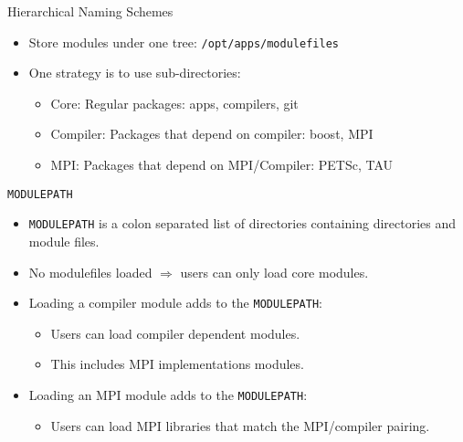 \documentclass[dvipsnames,aspectratio=169]{beamer}
\begin{document}
\begin{frame}{Hierarchical Naming Schemes}
  \begin{itemize}
    \item Store modules under one tree: \texttt{/opt/apps/modulefiles}
    \item One strategy is to use sub-directories:
      \begin{itemize}
        \item Core: Regular packages: apps, compilers, git
        \item Compiler: Packages that depend on compiler: boost, MPI
        \item MPI: Packages that depend on MPI/Compiler: PETSc, TAU
      \end{itemize}
  \end{itemize}
\end{frame}

\begin{frame}{\texttt{MODULEPATH}}
  \begin{itemize}
    \item \texttt{MODULEPATH} is a colon separated list of directories
      containing directories and module files.
    \item No modulefiles loaded $\Rightarrow$ users can only load core modules.
    \item Loading a compiler module adds to the \texttt{MODULEPATH}:
      \begin{itemize}
        \item Users can load compiler dependent modules.
        \item This includes MPI implementations modules.
      \end{itemize}
    \item Loading an MPI module adds to the \texttt{MODULEPATH}:
      \begin{itemize}
        \item Users can load MPI libraries that match the MPI/compiler pairing.
      \end{itemize}
  \end{itemize}
\end{frame}
\end{document}
